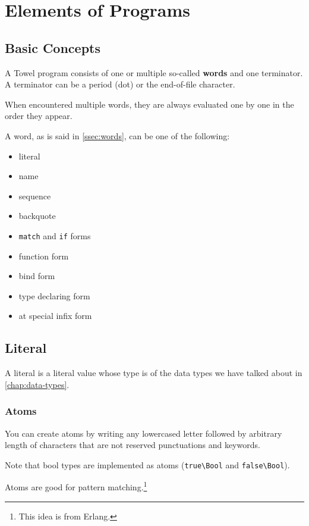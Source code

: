 \documentclass{book}
\begin{document}
\chapter{Elements of Programs}
\label{chap:forms}

\section{Basic Concepts}

A Towel program consists of one or multiple so-called \textbf{words} and one terminator. A terminator can be a period (dot) or the end-of-file character.

When encountered multiple words, they are always evaluated one by one in the order they appear.

A word, as is said in \autoref{ssec:words}, can be one of the following:
\begin{itemize}
\item literal
\item name
\item sequence
\item backquote
\item \texttt{match} and \texttt{if} forms
\item function form
\item bind form
\item type declaring form
\item at special infix form
\end{itemize}

\section{Literal}

A literal is a literal value whose type is of the data types we have talked about in \autoref{chap:data-types}.

\subsection{Atoms}

You can create atoms by writing any lowercased letter followed by arbitrary length of characters that are not reserved punctuations and keywords.

Note that bool types are implemented as atoms (\texttt{true\textbackslash Bool} and \texttt{false\textbackslash Bool}).

Atoms are good for pattern matching.\footnote{This idea is from Erlang.}
\end{document}
